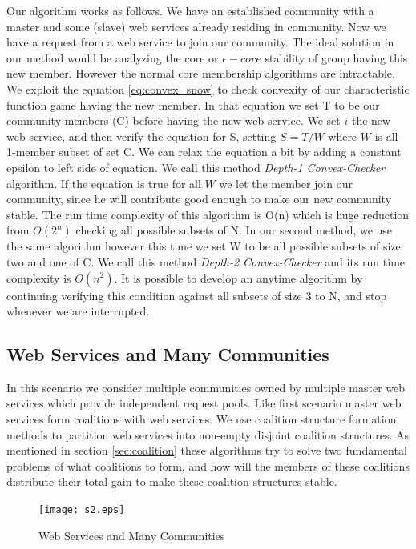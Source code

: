 \documentclass[10pt, conference, compsocconf]{IEEEtran}
\theoremstyle{plain}
\theoremstyle{definition}
\begin{document}
Our algorithm works as follows. We have an established community with a master and some (slave) web services already residing in community. Now we have a request from a web service to join our community. The ideal solution in our method would be analyzing the core or $\epsilon-core$ stability of group having this new member. However the normal core membership algorithms are intractable. We exploit the equation \ref{eq:convex_snow} to check convexity of our characteristic function game having the new member. In that equation we set T to be our community members (C) before having the new web service. We set ${i}$ the new web service, and then verify the equation for S, setting $ S = T / W $ where $W$ is all 1-member subset of set C. We can relax the equation a bit by adding a constant epsilon to left side of equation. We call this method \emph{Depth-1 Convex-Checker} algorithm. If the equation is true for all $W$ we let the member join our community, since he will contribute good enough to make our new community stable. The run time complexity of this algorithm is O(n) which is huge reduction from $O(2^n)$ checking all possible subsets of N. In our second method, we use the same algorithm however this time we set W to be all possible subsets of size two and one of C. We call this method \emph{Depth-2 Convex-Checker} and its run time complexity is $O(n^2)$. It is possible to develop an anytime algorithm by continuing verifying this condition against all subsets of size 3 to N, and stop whenever we are interrupted.

\subsection {Web Services and Many Communities}

In this scenario we consider multiple communities owned by multiple master web services which provide independent request pools. Like first scenario master web services form coalitions with web services. We use coalition structure formation methods to partition web services into non-empty disjoint coalition structures. As mentioned in section \ref{sec:coalition} these algorithms \cite{DBLP:conf/ijcai/GrecoMPS11, DBLP:conf/ijcai/RahwanMJ11} try to solve two fundamental problems of what coalitions to form, and how will the members of these coalitions distribute their total gain to make these coalition structures stable. 

\begin{figure}[!t]
\centering
\texttt{[image: s2.eps]}
\caption{Web Services and Many Communities}
\label{fig_sim}
\end{figure}
\end{document}
